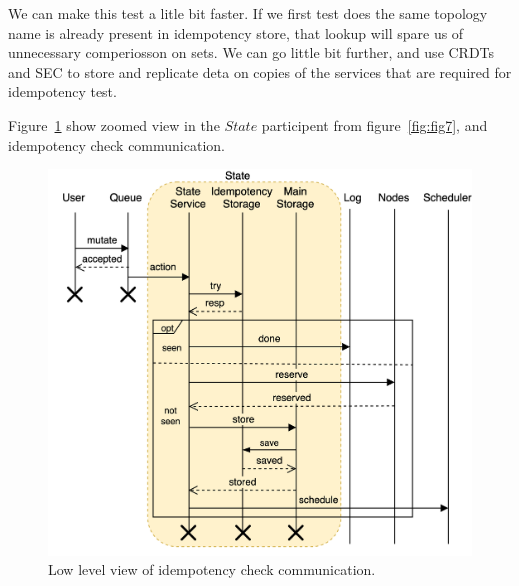 We can make this test a litle bit faster. If we first test does the same topology name is already present in idempotency store, that lookup will spare us of unnecessary comperiosson on sets.
We can go little bit further, and use CRDTs and SEC to store and replicate deta on copies of the services that are required for idempotency test.

Figure~\ref{fig:fig13} show zoomed view in the $State$ participent from figure~\ref{fig:fig7}, and idempotency check communication.

\begin{figure}[H]
	\begin{center}
		\includegraphics[scale=0.7]{images/Figure13}
	\end{center}
	\vspace{-0.7cm}
	\caption{Low level view of idempotency check communication.}
	\label{fig:fig13}
\end{figure}

